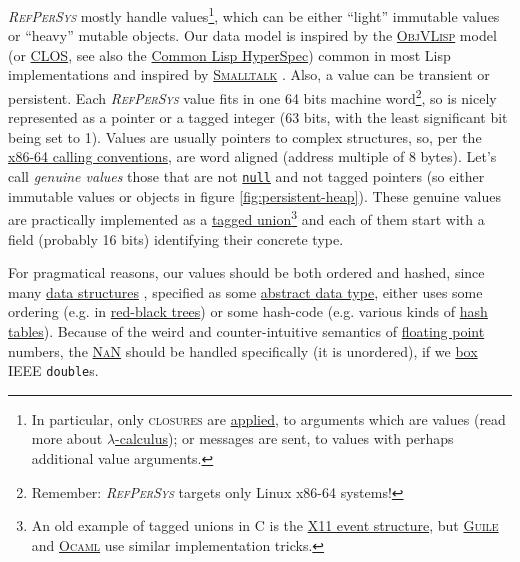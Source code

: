 \documentclass[11pt,a4paper,svgnames]{article}
\newcommand{\RefPerSys}{{\textit{\textsc{RefPerSys}}}}
\begin{document}
{\RefPerSys} mostly handle values\footnote{In particular, only
\textsc{closures} are
\href{https://en.wikipedia.org/wiki/Function_application}{applied}, to
arguments which are values (read more about
\href{https://en.wikipedia.org/wiki/Lambda_calculus}{$\lambda$-calculus});
or messages are sent, to values with perhaps additional value
arguments.}, which can be either ``light'' immutable values or
  ``heavy'' mutable objects. Our data model is inspired by the
  \href{https://en.wikipedia.org/wiki/ObjVlisp}{\textsc{ObjVLisp}}
  model (or
  \href{https://en.wikipedia.org/wiki/Common_Lisp_Object_System}{\textsc{CLOS}},
  see also the
  \href{http://www.lispworks.com/documentation/HyperSpec/Front/index.htm}{Common
    Lisp HyperSpec}) common in most Lisp implementations
  \cite{queinnec:2003:lisp, cointe:1987:metaclasses,
    briot:1987:uniform} and inspired by
  \href{https://en.wikipedia.org/wiki/Smalltalk}{\textsc{Smalltalk}}
  \cite{kay:1996:early-smalltalk}. Also, a value can be transient or
  persistent. Each {\RefPerSys} value fits in one 64 bits machine
  word\footnote{Remember: {\RefPerSys} targets only Linux x86-64
  systems!}, so is nicely represented as a pointer or a tagged integer
  (63 bits, with the least significant bit being set to 1). Values are
  usually pointers to complex structures, so, per the
  \href{https://github.com/hjl-tools/x86-psABI/wiki/x86-64-psABI-1.0.pdf}{x86-64
    calling conventions}, are word aligned (address multiple of 8
  bytes). Let's call \emph{genuine values} those that are not
  \href{https://medium.com/@hinchman_amanda/null-pointer-references-the-billion-dollar-mistake-1e616534d485}{\texttt{null}}
  and not tagged pointers (so either immutable values or objects in
  figure \ref{fig:persistent-heap}). These genuine values are
  practically implemented as a \href{
    https://en.wikipedia.org/wiki/Tagged_union}{tagged
    union}\footnote{An old example of tagged unions in C is the
  \href{https://tronche.com/gui/x/xlib/events/structures.html}{X11
    event structure}, but
  \href{https://www.gnu.org/software/guile/manual/html\_node/A-Simple-Representation.html}{\textsc{Guile}}
  and
  \href{https://caml.inria.fr/pub/docs/manual-ocaml/intfc.html}{\textsc{Ocaml}}
  use similar implementation tricks.} and each of them start with a
  field (probably 16 bits) identifying their concrete type.

  For pragmatical reasons, our values should be both ordered and
  hashed, since many
  \href{https://en.wikipedia.org/wiki/Data\_structure}{data
    structures} \cite{cormen:2009:introduction}, specified as some
  \href{https://en.wikipedia.org/wiki/Abstract_data_type}{abstract
    data type}, either uses some ordering
  (e.g. in \href{https://en.wikipedia.org/wiki/Red-black_tree}{red-black
    trees}) or some hash-code (e.g. various kinds of
  \href{https://en.wikipedia.org/wiki/Hash_table}{hash
    tables}). Because of the weird and counter-intuitive semantics of
  \href{http://floating-point-gui.de}{floating point} numbers, the
  \href{https://en.wikipedia.org/wiki/NaN}{\textsc{NaN}} should be
  handled specifically (it is unordered), if we
  \href{https://en.wikipedia.org/wiki/Object\_type\_(object-oriented\_programming)\#Boxing}{box}
  IEEE \texttt{double}s.
\end{document}
